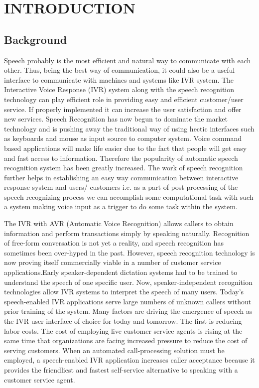 

\section{INTRODUCTION}


\subsection{Background}

Speech probably is the most efficient and natural way to communicate with each other. Thus, being the best way of communication, it could also be a useful interface to communicate with machines and systems like IVR system. The Interactive Voice Response (IVR) system along with the speech recognition technology can play efficient role in providing easy and efficient customer/user service. If properly implemented it can increase the user satisfaction and offer new services. Speech Recognition has now begun to dominate the market technology and is pushing away the traditional way of using hectic interfaces such as keyboards and mouse as input source to computer system. Voice command based applications will make life easier due to the fact that people will get easy and fast access to information. Therefore the popularity of automatic speech recognition system has been greatly increased. The work of speech recognition further helps in establishing  an easy way communication between interactive response system and users/ customers i.e. as a part of post processing of the speech recognizing process we can accomplish some computational task with such a system making voice input as a trigger to do some task within the system.


\setlength{\parindent}{1cm}The IVR with AVR (Automatic Voice Recognition) allows callers to obtain information and perform transactions simply by speaking naturally. Recognition of free-form conversation is not yet a reality, and speech recognition has sometimes been over-hyped in the past. However, speech recognition technology is now proving itself commercially viable in a number of customer service applications.Early speaker-dependent dictation systems had to be trained to understand the speech of one specific user. Now, speaker-independent recognition technologies allow IVR systems to interpret the speech of many users. Today's speech-enabled IVR applications serve large numbers of unknown callers without prior training of the system. Many factors are driving the emergence of speech as the IVR user interface of choice for today and tomorrow. The first is reducing labor costs. The cost of employing live customer service agents is rising at the same time that organizations are facing increased pressure to reduce the cost of serving customers. When an automated call-processing solution must be employed, a speech-enabled IVR application increases caller acceptance because it provides the friendliest and fastest self-service alternative to speaking with a customer service agent. 

